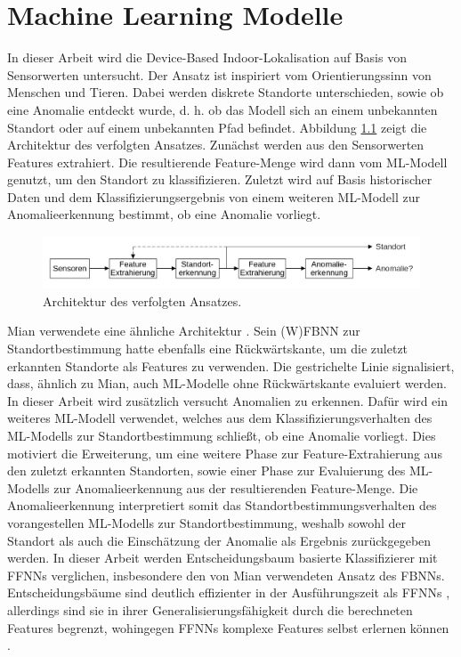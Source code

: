 \chapter{Machine Learning Modelle}
In dieser Arbeit wird die Device-Based Indoor-Lokalisation auf Basis von Sensorwerten untersucht.
Der Ansatz ist inspiriert vom Orientierungssinn von Menschen und Tieren.
Dabei werden diskrete Standorte unterschieden, sowie ob eine Anomalie entdeckt wurde,
d. h. ob das Modell sich an einem unbekannten Standort oder auf einem unbekannten Pfad befindet.
\newline
\newline
Abbildung \ref{fig:model_idea} zeigt die Architektur des verfolgten Ansatzes.
Zunächst werden aus den Sensorwerten Features extrahiert.
Die resultierende Feature-Menge wird dann vom ML-Modell genutzt, um den Standort zu klassifizieren.
Zuletzt wird auf Basis historischer Daten und dem Klassifizierungsergebnis von einem weiteren ML-Modell zur Anomalieerkennung bestimmt, ob eine Anomalie vorliegt.
\begin{figure}[h!]
    \centering
    \includegraphics[width=\linewidth]{images/model_idea.png}
    \caption{Architektur des verfolgten Ansatzes.}
    \label{fig:model_idea}
\end{figure}
\newline
Mian verwendete eine ähnliche Architektur \cite{naveedThesis}.
Sein (W)FBNN zur Standortbestimmung hatte ebenfalls eine Rückwärtskante, um die zuletzt erkannten Standorte als Features zu verwenden.
Die gestrichelte Linie signalisiert, dass, ähnlich zu Mian, auch ML-Modelle ohne Rückwärtskante evaluiert werden.
In dieser Arbeit wird zusätzlich versucht Anomalien zu erkennen.
Dafür wird ein weiteres ML-Modell verwendet, welches aus dem Klassifizierungsverhalten des ML-Modells zur Standortbestimmung schließt, ob eine Anomalie vorliegt.
Dies motiviert die Erweiterung, um eine weitere Phase zur Feature-Extrahierung aus den zuletzt erkannten Standorten,
sowie einer Phase zur Evaluierung des ML-Modells zur Anomalieerkennung aus der resultierenden Feature-Menge.
\newpage
Die Anomalieerkennung interpretiert somit das Standortbestimmungsverhalten des vorangestellen ML-Modells zur Standortbestimmung,
weshalb sowohl der Standort als auch die Einschätzung der Anomalie als Ergebnis zurückgegeben werden.
\newline
\newline
In dieser Arbeit werden Entscheidungsbaum basierte Klassifizierer mit FFNNs verglichen, insbesondere den von Mian verwendeten Ansatz des FBNNs.
Entscheidungsbäume sind deutlich effizienter in der Ausführungszeit als FFNNs \cite{dymelThesis},
allerdings sind sie in ihrer Generalisierungsfähigkeit durch die berechneten Features begrenzt,
wohingegen FFNNs komplexe Features selbst erlernen können \cite{seide2011feature}.







